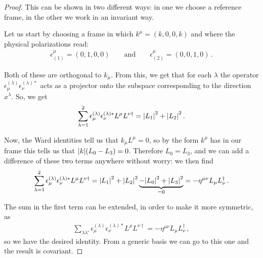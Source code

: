 \documentclass[main.tex]{subfiles}
\begin{document}
\begin{proof}
This can be shown in two different ways: in one we choose a reference frame, in the other we work in an invariant way. 

Let us start by choosing a frame in which \(k^{\mu } = (k, 0, 0, k)\) and where the physical polarizations read: 
%
\begin{align}
\epsilon^{\mu }_{(1)} = (0, 1, 0, 0)
\qquad \text{and} \qquad
\epsilon^{\mu }_{(2)} = (0, 0, 1, 0)
\,.
\end{align}

Both of these are orthogonal to \(k_{\mu }\). From this, we get that for each \(\lambda \) the operator \(\epsilon_{\mu }^{(\lambda )} \epsilon^{(\lambda )*}_{\nu }\) acts as a projector onto the subspace corresponding to the direction \(x^{\lambda }\). So, we get 
%
\begin{align}
\sum _{\lambda = 1}^{2} 
\epsilon_{\mu }^{(\lambda )} \epsilon^{(\lambda )*}_{\nu } L^{\mu }L^{\nu \dag}
= \abs{L_1 }^2 + \abs{L_2 }^2
\,.
\end{align}

Now, the Ward identities tell us that \(k_{\mu }L^{\mu } = 0\), so by the form \(k^{\mu }\) has in our frame this tells us that \(\abs{k} \qty(L_0 - L_3 ) =0\). Therefore \(L_0 = L_3 \), and we can add a difference of these two terms anywhere without worry: we then find 
%
\begin{align}
\sum _{\lambda = 1}^{2} 
\epsilon_{\mu }^{(\lambda )} \epsilon^{(\lambda )*}_{\nu } L^{\mu }L^{\nu \dag}
= \abs{L_1 }^2 + \abs{L_2 }^2
\underbrace{- \abs{L_0 }^2 + \abs{L_3 }^2}_{=0} = - \eta^{\mu \nu }L_{\mu } L_{\nu} ^\dag
\,.
\end{align}

The sum in the first term can be extended, in order to make it more symmetric, as 
%
\begin{align}
\sum _{\lambda \lambda '} 
\epsilon_{\mu }^{(\lambda )} \epsilon^{(\lambda )*}_{\nu } L^{\mu }L^{\nu \dag} = - \eta^{\mu \nu } L_{\mu } L_{\nu } ^\dag
\,,
\end{align}
%
so we have the desired identity.
From a generic basis we can go to this one and the result is covariant.
\end{proof}
\end{document}
